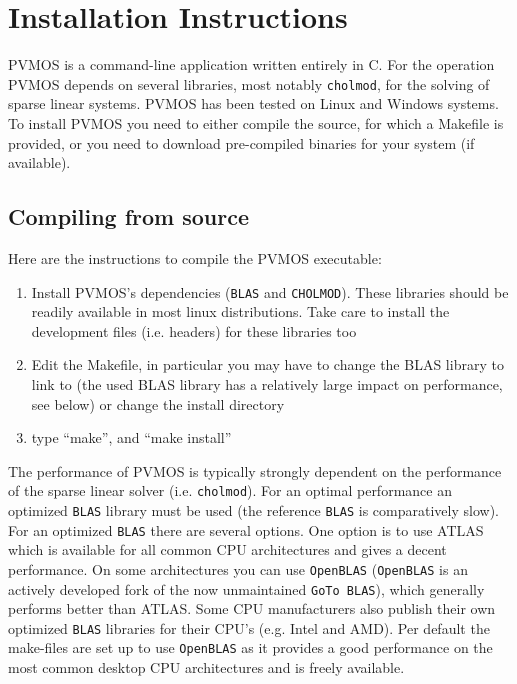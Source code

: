 \documentclass[noshowpacs,preprintnumbers,amsmath,amssymb, letter]{revtex4}
\begin{document}
\section{Installation Instructions}	
PVMOS is a command-line application written entirely in C. For the operation PVMOS depends on several libraries, most notably \texttt{cholmod}, for the solving of sparse linear systems. PVMOS has been tested on Linux and Windows systems. To install PVMOS you need to either compile the source, for which a Makefile is provided, or you need to download pre-compiled binaries for your system (if available). 

\subsection{Compiling from source}
Here are the instructions to compile the PVMOS executable:
\begin{enumerate}
\item{} Install PVMOS's dependencies (\texttt{BLAS} and \texttt{CHOLMOD}). These libraries should be readily available in most linux distributions. Take care to install the development files (i.e. headers) for these libraries too 
\item{} Edit the Makefile, in particular you may have to change the BLAS library to link to (the used BLAS library has a relatively large impact on performance, see below) or change the install directory
\item{} type ``make'', and ``make install''
\end{enumerate}

The performance of PVMOS is typically strongly dependent on the performance of the sparse linear solver (i.e. \texttt{cholmod}). For an optimal performance an optimized \texttt{BLAS} library must be used (the reference \texttt{BLAS} is comparatively slow). For an optimized \texttt{BLAS} there are several options. One option is to use ATLAS which is available for all common CPU architectures and gives a decent performance. On some architectures you can use \texttt{OpenBLAS} (\texttt{OpenBLAS} is an actively developed fork of the now unmaintained \texttt{GoTo BLAS}), which generally performs better than ATLAS. Some CPU manufacturers also publish their own optimized \texttt{BLAS} libraries for their CPU's (e.g. Intel and AMD). Per default the make-files are set up to use \texttt{OpenBLAS} as it provides a good performance on the most common desktop CPU architectures and is freely available.
\end{document}
